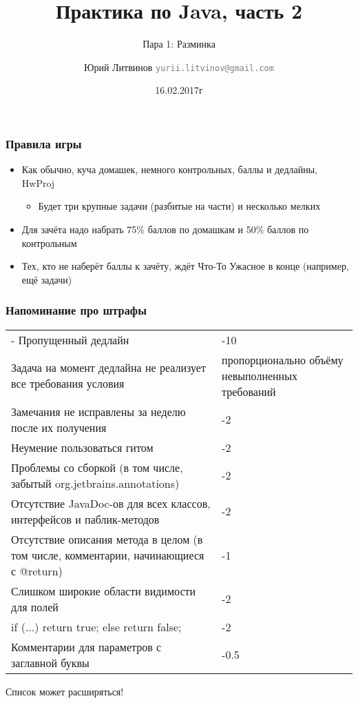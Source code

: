 \documentclass[xetex,mathserif,serif]{beamer}
\title{Практика по Java, часть 2}
\subtitle{Пара 1: Разминка}
\author[Юрий Литвинов]{Юрий Литвинов \newline \textcolor{gray}{\small\texttt{yurii.litvinov@gmail.com}}}
\date{16.02.2017г}
\begin{document}
	
	\frame{\titlepage}
	
	\begin{frame}
		\frametitle{Правила игры}
		\begin{itemize}
			\item Как обычно, куча домашек, немного контрольных, баллы и дедлайны, HwProj
			\begin{itemize}
				\item Будет три крупные задачи (разбитые на части) и несколько мелких
			\end{itemize}
			\item Для зачёта надо набрать 75\% баллов по домашкам и 50\% баллов по контрольным
			\item Тех, кто не наберёт баллы к зачёту, ждёт Что-То Ужасное в конце (например, ещё задачи)
		\end{itemize}
	\end{frame}

	\begin{frame}
		\frametitle{Напоминание про штрафы}
		\begin{scriptsize}
			\begin{tabu} {| X[1 l p] | X[0.3 l p] |}
				\tabucline-
				\everyrow{\tabucline-}
				Пропущенный дедлайн                                                                   & -10 \\
				Задача на момент дедлайна не реализует все требования условия                         & пропорционально объёму невыполненных требований \\
				Замечания не исправлены за неделю после их получения                                  & -2 \\
				Неумение пользоваться гитом                                                           & -2 \\
				Проблемы со сборкой (в том числе, забытый org.jetbrains.annotations)                  & -2 \\
				Отсутствие JavaDoc-ов для всех классов, интерфейсов и паблик-методов                  & -2 \\
				Отсутствие описания метода в целом (в том числе, комментарии, начинающиеся с @return) & -1 \\
				Слишком широкие области видимости для полей                                           & -2 \\
				if (...) return true; else return false;                                              & -2 \\
				Комментарии для параметров с заглавной буквы                                          & -0.5 \\
			\end{tabu}
		\end{scriptsize}
		\begin{center}
			\scriptsize{Список может расширяться!}
		\end{center}
	\end{frame}
\end{document}
